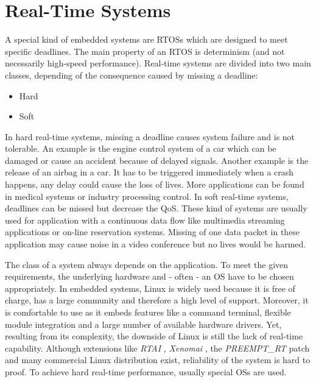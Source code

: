 \section{Real-Time Systems}
A special kind of embedded systems are \acp{RTOS} which are designed to meet specific deadlines. 
The main property of an \ac{RTOS} is determinism (and not necessarily high-speed performance). 
Real-time systems are divided into two main classes, depending of the consequence caused by missing a deadline:
\begin{itemize}
	\item Hard
	\item Soft
\end{itemize}
In hard real-time systems, missing a deadline causes system failure and is not tolerable.  
An example is the engine control system of a car which can be damaged or cause an accident because of delayed signals.
Another example is the release of an airbag in a car. 
It has to be triggered immediately when a crash happens, any delay could cause the loss of lives. 
More applications can be found in medical systems or industry processing control.  
In soft real-time systems, deadlines can be missed but decrease the \ac{QoS}. 
These kind of systems are usually used for application with a continuous data flow like multimedia streaming applications or on-line reservation systems.
Missing of one data packet in these application may cause noise in a video conference but no lives would be harmed.
\par
The class of a system always depends on the application. 
To meet the given requirements, the underlying hardware and - often - an \ac{OS} have to be chosen appropriately. 
In embedded systems, Linux is widely used because it is free of charge, has a large community and therefore a high level of support. 
Moreover, it is comfortable to use as it embeds features like a command terminal, flexible module integration and a large number of available hardware drivers. 
Yet, resulting from its complexity, the downside of Linux is still the lack of real-time capability. 
Although extensions like \textit{\ac{RTAI}} \cite{rtai}, \textit{Xenomai} \cite{xenomai}, the \textit{PREEMPT\_RT} patch and many commercial Linux distribution exist, reliability of the system is hard to proof. 
To achieve hard real-time performance, usually special \acp{OS} are used. 
